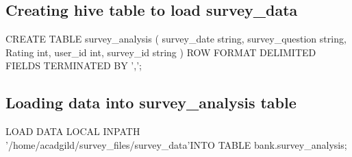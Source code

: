 \subsection{Creating hive table to load survey\_data}

CREATE TABLE survey\_analysis ( \newline
survey\_date string, \newline
survey\_question string, \newline
Rating int, \newline
user\_id int, \newline
survey\_id string \newline
) \newline
ROW FORMAT DELIMITED  \newline
FIELDS TERMINATED BY ',';  \newline

\subsection{Loading data into survey\_analysis table}

LOAD DATA LOCAL INPATH '/home/acadgild/survey\_files/survey\_data'\newline INTO TABLE \newline
bank.survey\_analysis; \newpage


